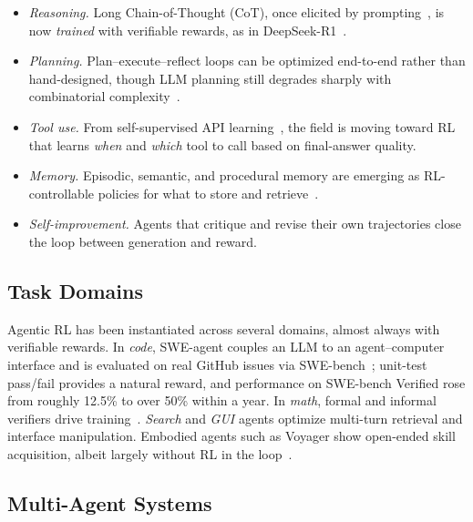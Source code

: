 \begin{itemize}
\item \textit{Reasoning.} Long Chain-of-Thought (CoT), once elicited by
prompting~\cite{wei2022cot,yao2023tot,besta2024got}, is now \emph{trained}
with verifiable rewards, as in DeepSeek-R1~\cite{guo2025deepseekr1}.

\item \textit{Planning.} Plan--execute--reflect loops can be optimized
end-to-end rather than hand-designed, though LLM planning still degrades
sharply with combinatorial complexity~\cite{valmeekam2024planning}.

\item \textit{Tool use.} From self-supervised API
learning~\cite{schick2023toolformer,qin2023toolllm,patil2023gorilla},
the field is moving toward RL that learns \emph{when} and \emph{which}
tool to call based on final-answer quality.

\item \textit{Memory.} Episodic, semantic, and procedural memory are
emerging as RL-controllable policies for what to store and
retrieve~\cite{sun2025lifelong}.

\item \textit{Self-improvement.} Agents that critique and revise their
own trajectories close the loop between generation and reward.
\end{itemize}

\subsection{Task Domains}

Agentic RL has been instantiated across several domains, almost always
with verifiable rewards. In \emph{code}, SWE-agent couples an
LLM to an agent--computer interface and is evaluated on real GitHub
issues via SWE-bench~\cite{yang2024sweagent,jimenez2024swebench,wang2024codeact};
unit-test pass/fail provides a natural reward, and performance on
SWE-bench Verified rose from roughly 12.5\% to over 50\% within a year.
In \emph{math}, formal and informal verifiers drive
training~\cite{shao2024deepseekmath,lightman2023verify}. \emph{Search}
and \emph{GUI} agents optimize multi-turn retrieval and interface
manipulation. Embodied agents such as Voyager show open-ended skill
acquisition, albeit largely without RL in the loop~\cite{wang2023voyager}.

\subsection{Multi-Agent Systems}

